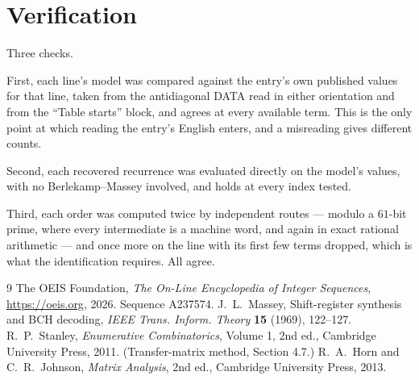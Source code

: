 \documentclass[11pt,a4paper]{article}
\theoremstyle{plain}
\theoremstyle{definition}
\begin{document}
\section{Verification}

Three checks.

First, each line's model was compared against the entry's own published values for that line,
taken from the antidiagonal DATA read in either orientation and from the ``Table starts''
block, and agrees at every available term. This is the only point at which reading the entry's
English enters, and a misreading gives different counts.

Second, each recovered recurrence was evaluated directly on the model's values, with no
Berlekamp--Massey involved, and holds at every index tested.

Third, each order was computed twice by independent routes --- modulo a $61$-bit prime, where
every intermediate is a machine word, and again in exact rational arithmetic --- and once more
on the line with its first few terms dropped, which is what the identification requires. All
agree.

\begin{thebibliography}{9}
 The OEIS Foundation, \emph{The On-Line Encyclopedia of Integer
Sequences}, \url{https://oeis.org}, 2026. Sequence A237574.
 J.~L.~Massey, Shift-register synthesis and BCH decoding, \emph{IEEE
Trans. Inform. Theory} \textbf{15} (1969), 122--127.
 R.~P.~Stanley, \emph{Enumerative Combinatorics}, Volume 1, 2nd ed.,
Cambridge University Press, 2011. (Transfer-matrix method, Section 4.7.)
 R.~A.~Horn and C.~R.~Johnson, \emph{Matrix Analysis}, 2nd ed., Cambridge
University Press, 2013.
\end{thebibliography}
\end{document}
